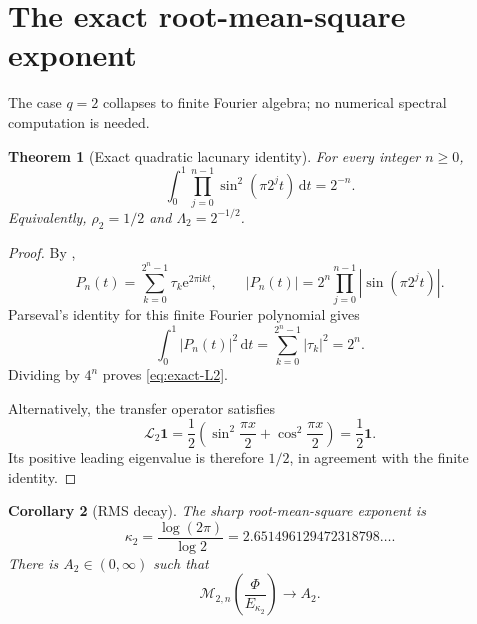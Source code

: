 \documentclass[11pt,oneside]{article}
\numberwithin{equation}{section}
\newtheorem{theorem}{Theorem}[section]
\newtheorem{corollary}[theorem]{Corollary}
\theoremstyle{definition}
\theoremstyle{remark}
\newcommand{\e}{\mathrm e}
\newcommand{\ii}{\mathrm i}
\newcommand{\dd}{\,\mathrm d}
\newcommand{\PhiUp}{\Phi}
\newcommand{\TM}{\tau}
\newcommand{\Transfer}{\mathcal L}
\begin{document}
\begin{center}
\end{center}

\section{The exact root-mean-square exponent}
\label{sec:rms}

The case \(q=2\) collapses to finite Fourier algebra; no numerical spectral computation is
needed.

\begin{theorem}[Exact quadratic lacunary identity]
\label{thm:exact-L2}
For every integer \(n\ge0\),
\begin{equation}
 \int_0^1\prod_{j=0}^{n-1}\sin^2(\pi2^jt)\dd t=2^{-n}.
 \label{eq:exact-L2}
\end{equation}
Equivalently, \(\rho_2=1/2\) and \(\Lambda_2=2^{-1/2}\).
\end{theorem}

\begin{proof}
By ,
\[
 P_n(t)=\sum_{k=0}^{2^n-1}\TM_k\e^{2\pi\ii kt},
 \qquad
 |P_n(t)|=2^n\prod_{j=0}^{n-1}|\sin(\pi2^jt)|.
\]
Parseval's identity for this finite Fourier polynomial gives
\[
 \int_0^1|P_n(t)|^2\dd t
 =\sum_{k=0}^{2^n-1}|\TM_k|^2=2^n.
\]
Dividing by \(4^n\) proves \eqref{eq:exact-L2}.

Alternatively, the transfer operator satisfies
\[
 \Transfer_2\mathbf1
 =\frac12\left(\sin^2\frac{\pi x}{2}+
                 \cos^2\frac{\pi x}{2}\right)=\frac12\mathbf1.
\]
Its positive leading eigenvalue is therefore \(1/2\), in agreement with the finite
identity.
\end{proof}

\begin{corollary}[RMS decay]
\label{cor:RMS}
The sharp root-mean-square exponent is
\begin{equation}
 \boxed{
 \kappa_2=\frac{\log(2\pi)}{\log2}}
 =2.651496129472318798\ldots .
 \label{eq:kappa2}
\end{equation}
There is \(A_2\in(0,\infty)\) such that
\begin{equation}
 \mathcal M_{2,n}\!\left(\frac{\PhiUp}{E_{\kappa_2}}\right)\longrightarrow A_2.
 \label{eq:RMS-limit}
\end{equation}
\end{corollary}
\end{document}
